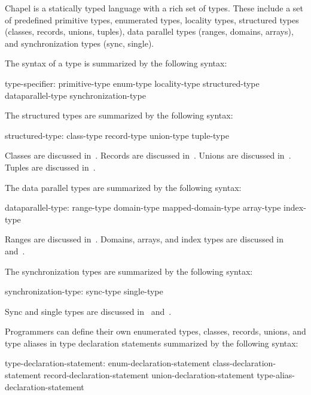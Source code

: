 \label{Types}

Chapel is a statically typed language with a rich set of types.  These
include a set of predefined primitive types, enumerated types,
locality types, structured types (classes, records, unions, tuples),
data parallel types (ranges, domains, arrays), and synchronization
types (sync, single).


The syntax of a type is summarized by the following syntax:

\begin{syntax}
type-specifier:
  primitive-type
  enum-type
  locality-type
  structured-type
  dataparallel-type
  synchronization-type
\end{syntax}

The structured types are summarized by the following syntax:

\begin{syntax}
structured-type:
  class-type
  record-type
  union-type
  tuple-type
\end{syntax}

Classes are discussed in~.  Records are discussed
in~.  Unions are discussed in~.  Tuples are
discussed in~.  

The data parallel types are summarized by the following syntax:

\begin{syntax}
dataparallel-type:
  range-type
  domain-type
  mapped-domain-type
  array-type
  index-type
\end{syntax}

Ranges are discussed in~.  Domains, arrays, and index
types are discussed in~ and~.

The synchronization types are summarized by the following syntax:

\begin{syntax}
synchronization-type:
  sync-type
  single-type
\end{syntax}

Sync and single types are discussed in~
and~.

Programmers can define their own enumerated types, classes, records,
unions, and type aliases in type declaration statements summarized by
the following syntax:
\begin{syntax}
type-declaration-statement:
  enum-declaration-statement
  class-declaration-statement
  record-declaration-statement
  union-declaration-statement
  type-alias-declaration-statement
\end{syntax}

